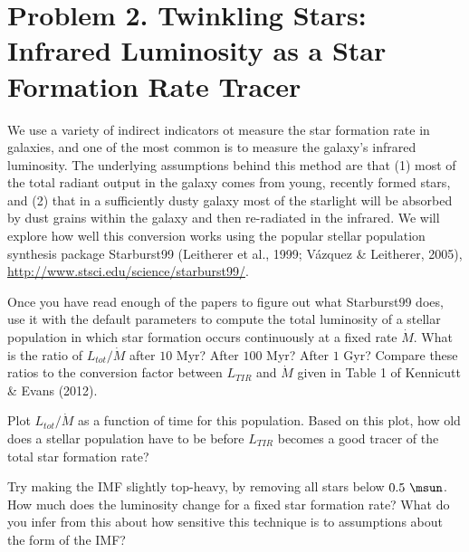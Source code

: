 \documentclass[11pt]{article}
\newenvironment{tight_enumerate}{
    \begin{enumerate}[label=(\alph*)]
    \setlength{\itemsep}{3pt}
    \setlength{\parskip}{0pt}}
    {\end{enumerate}}
\begin{document}
\newpage
\section*{Problem 2. Twinkling Stars: Infrared Luminosity as a Star Formation Rate Tracer}
We use a variety of indirect indicators ot measure the star formation rate in galaxies, and one of the most common is to measure the galaxy's infrared luminosity. The underlying assumptions behind this method are that (1) most of the total radiant output in the galaxy comes from young, recently formed stars, and (2) that in a sufficiently dusty galaxy most of the starlight will be absorbed by dust grains within the galaxy and then re-radiated in the infrared. We will explore how well this conversion works using the popular stellar population synthesis package Starburst99 (Leitherer et al., 1999; V\'azquez \& Leitherer, 2005), \url{http://www.stsci.edu/science/starburst99/}.

\begin{tight_enumerate}
\item Once you have read enough of the papers to figure out what Starburst99 does, use it with the default parameters to compute the total luminosity of a stellar population in which star formation occurs continuously at a fixed rate $\dot{M}$. What is the ratio of $L_{tot}/\dot{M}$ after $10$ Myr? After $100$ Myr? After $1$ Gyr? Compare these ratios to the conversion factor between $L_{TIR}$ and $\dot{M}$ given in Table 1 of Kennicutt \& Evans (2012).

\item Plot $L_{tot}/\dot{M}$ as a function of time for this population. Based on this plot, how old does a stellar population have to be before $L_{TIR}$ becomes a good tracer of the total star formation rate?

\item Try making the IMF slightly top-heavy, by removing all stars below $0.5\ \si{\msun}$. How much does the luminosity change for a fixed star formation rate? What do you infer from this about how sensitive this technique is to assumptions about the form of the IMF?
\end{tight_enumerate}
\end{document}
